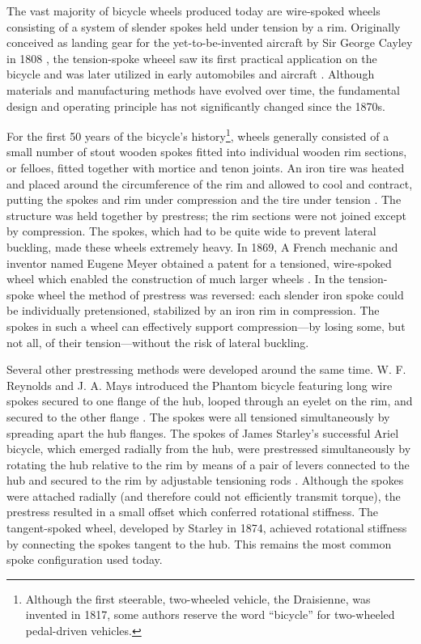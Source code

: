 \documentclass[../thesis.tex]{subfiles}
\begin{document}
The vast majority of bicycle wheels produced today are wire-spoked wheels consisting of a system of slender spokes held under tension by a rim. Originally conceived as landing gear for the yet-to-be-invented aircraft by Sir George Cayley in 1808 \cite{Ackroyd2011}, the tension-spoke wheeel saw its first practical application on the bicycle and was later utilized in early automobiles and aircraft \cite{Hadland2014}. Although materials and manufacturing methods have evolved over time, the fundamental design and operating principle has not significantly changed since the 1870s.

For the first 50 years of the bicycle's history\footnote{Although the first steerable, two-wheeled vehicle, the Draisienne, was invented in 1817, some authors reserve the word ``bicycle'' for two-wheeled pedal-driven vehicles.}, wheels generally consisted of a small number of stout wooden spokes fitted into individual wooden rim sections, or felloes, fitted together with mortice and tenon joints. An iron tire was heated and placed around the circumference of the rim and allowed to cool and contract, putting the spokes and rim under compression and the tire under tension \cite{Sharp1977}. The structure was held together by prestress; the rim sections were not joined except by compression. The spokes, which had to be quite wide to prevent lateral buckling, made these wheels extremely heavy. In 1869, A French mechanic and inventor named Eugene Meyer obtained a patent for a tensioned, wire-spoked wheel which enabled the construction of much larger wheels \cite{Clayton1991}. In the tension-spoke wheel the method of prestress was reversed: each slender iron spoke could be individually pretensioned, stabilized by an iron rim in compression. The spokes in such a wheel can effectively support compression---by losing some, but not all, of their tension---without the risk of lateral buckling.

Several other prestressing methods were developed around the same time. W. F. Reynolds and J. A. Mays introduced the Phantom bicycle featuring long wire spokes secured to one flange of the hub, looped through an eyelet on the rim, and secured to the other flange \cite{Herlihy2004}. The spokes were all tensioned simultaneously by spreading apart the hub flanges. The spokes of James Starley's successful Ariel bicycle, which emerged radially from the hub, were prestressed simultaneously by rotating the hub relative to the rim by means of a pair of levers connected to the hub and secured to the rim by adjustable tensioning rods \cite{Caunter1955}. Although the spokes were attached radially (and therefore could not efficiently transmit torque), the prestress resulted in a small offset which conferred rotational stiffness. The tangent-spoked wheel, developed by Starley in 1874, achieved rotational stiffness by connecting the spokes tangent to the hub. This remains the most common spoke configuration used today.
\end{document}
